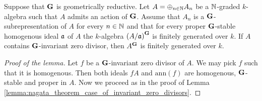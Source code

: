 \begin{lemma}\label{lemma:nagata_theorem_case_of_invariant_zero_divisors_with_gradation}
Suppose that $\mathbf{G}$ is geometrically reductive. Let $A = \oplus_{n\in {\mathbb N}}A_n$ be a ${\mathbb N}$-graded $k$-algebra such that $A$ admits an action of $\mathbf{G}$. Assume that $A_n$ is a $\mathbf{G}$-subrepresentation of $A$ for every $n\in {\mathbb N}$ and that for every proper $\mathbf{G}$-stable homogenous ideal $\mathfrak{a}$ of $A$ the $k$-algebra $\left(A/\mathfrak{a}\right)^{\mathbf{G}}$ is finitely generated over $k$. If $A$ contains $\mathbf{G}$-invariant zero divisor, then $A^{\mathbf{G}}$ is finitely generated over $k$.
\end{lemma}
\begin{proof}[Proof of the lemma]
Let $f$ be a $\mathbf{G}$-invariant zero divisor of $A$. We may pick $f$ such that it is homogenous. Then both ideals $fA$ and $\mathrm{ann}(f)$ are homogenous, $\mathbf{G}$-stable and proper in $A$. Now we proceed as in the proof of Lemma \ref{lemma:nagata_theorem_case_of_invariant_zero_divisors}. 
\end{proof}

